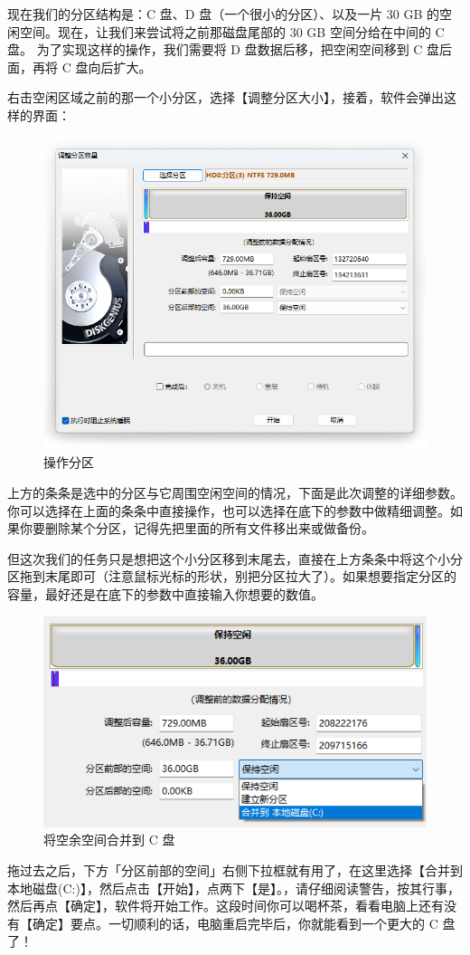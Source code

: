 {现在我们的分区结构是：C 盘、D 盘（一个很小的分区）、以及一片 30 GB 的空闲空间。现在，让我们来尝试将之前那磁盘尾部的 30 GB 空间分给在中间的 C 盘。
为了实现这样的操作，我们需要将 D 盘数据后移，把空闲空间移到 C 盘后面，再将 C 盘向后扩大。

右击空闲区域之前的那一个小分区，选择【调整分区大小】，接着，软件会弹出这样的界面：

\begin{figure}[htb!]
  \centering
  \includegraphics[width=.7\textwidth]{assets/advanced/Adjust_Part.png}
  \caption{操作分区}
  \label{fig:Adjust_Part}
\end{figure}

上方的条条是选中的分区与它周围空闲空间的情况，下面是此次调整的详细参数。你可以选择在上面的条条中直接操作，也可以选择在底下的参数中做精细调整。如果你要删除某个分区，记得先把里面的所有文件移出来或做备份。

但这次我们的任务只是想把这个小分区移到末尾去，直接在上方条条中将这个小分区拖到末尾即可（注意鼠标光标的形状，别把分区拉大了）。如果想要指定分区的容量，最好还是在底下的参数中直接输入你想要的数值。

\begin{figure}[htb!]
  \centering
  \includegraphics[width=.5\textwidth]{assets/advanced/Merge_To_C.png}
  \caption{将空余空间合并到 C 盘}
  \label{fig:Merge_To_C}
\end{figure}

拖过去之后，下方「分区前部的空间」右侧下拉框就有用了，在这里选择【合并到 本地磁盘(C:)】，然后点击【开始】，点两下【是】。，请仔细阅读警告，按其行事，然后再点【确定】，软件将开始工作。这段时间你可以喝杯茶，看看电脑上还有没有【确定】要点。一切顺利的话，电脑重启完毕后，你就能看到一个更大的 C 盘了！

}
